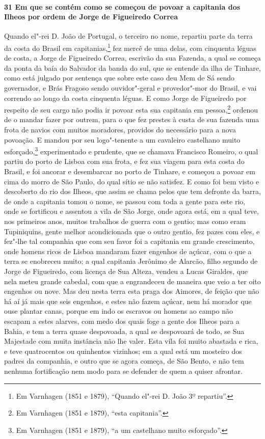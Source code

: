 \paragraph{31 Em que se contém como se começou de povoar a capitania dos Ilheos por ordem
de Jorge de Figueiredo Correa}

Quando el"-rei D. João de Portugal, o terceiro no nome, repartiu parte da terra da costa do
Brasil em capitanias,\footnote{ Em Varnhagen (1851 e 1879), ``Quando el"-rei D. João 3º
repartiu''.} fez mercê de uma delas, com cinquenta léguas de costa, a Jorge de Figueiredo
Correa, escrivão da sua Fazenda, a qual se começa da ponta da baía do Salvador da banda do
sul, que se entende da ilha de Tinhare, como está julgado por sentença que sobre este caso
deu Mem de Sá sendo governador, e Brás Fragoso sendo ouvidor"-geral e provedor"-mor do
Brasil, e vai correndo ao longo da costa cinquenta léguas. E como Jorge de Figueiredo por
respeito de seu cargo não podia ir povoar esta sua capitania em pessoa,\footnote{ Em
Varnhagen (1851 e 1879), ``esta capitania''.} ordenou de o mandar fazer por outrem, para o
que fez prestes à custa de sua fazenda uma frota de navios com muitos moradores, providos
do necessário para a nova povoação. E mandou por seu logo"-tenente a um cavaleiro
castelhano muito esforçado,\footnote{ Em Varnhagen (1851 e 1879), ``a um castelhano muito
esforçado''.} experimentado e prudente, que se chamava Francisco Romeiro, o qual partiu do
porto de Lisboa com sua frota, e fez sua viagem para esta costa do Brasil, e foi ancorar e
desembarcar no porto de Tinhare, e começou a povoar em cima do morro de São Paulo, do qual
sítio se não satisfez. E como foi bem visto e descoberto do rio dos Ilheos, que assim se
chama pelos que tem defronte da barra, de onde a capitania tomou o nome, se passou com
toda a gente para este rio, onde se fortificou e assentou a vila de São Jorge, onde agora
está, em a qual teve, nos primeiros anos, muitos trabalhos de guerra com o gentio; mas
como eram Tupiniquins, gente melhor acondicionada que o outro gentio, fez pazes com eles,
e fez"-lhe tal companhia que com seu favor foi a capitania em grande crescimento, onde
homens ricos de Lisboa mandaram fazer engenhos de açúcar, com o que a terra se enobreceu
muito; a qual capitania Jerônimo de Alarcão, filho segundo de Jorge de Figueiredo, com
licença de Sua Alteza, vendeu a Lucas Giraldes, que nela meteu grande cabedal, com que a
engrandeceu de maneira que veio a ter oito engenhos ou nove. Mas deu nesta terra esta
praga dos Aimores, de feição que não há aí já mais que seis engenhos, e estes não fazem
açúcar, nem há morador que ouse plantar canas, porque em indo os escravos ou homens ao
campo não escapam a estes alarves, com medo dos quais foge a gente dos Ilheos para a
Bahia, e tem a terra quase despovoada, a qual se despovoará de todo, se Sua Majestade com
muita instância não lhe valer. Esta vila foi muito abastada e rica, e teve quatrocentos ou
quinhentos vizinhos; em a qual está um mosteiro dos padres da companhia, e outro que se
agora começa, de São Bento, e não tem nenhuma fortificação nem modo para se defender de
quem a quiser afrontar.

